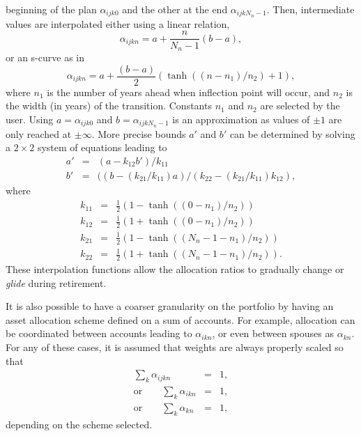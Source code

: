 \documentclass{article}[fleqn,12pt]
\begin{document}
\begin{description}[leftmargin=4em,style=multiline]
	beginning of the plan $\alpha_{ijk0}$ and the other at the end
	$\alpha_{ijkN_n-1}$. Then, intermediate values are interpolated either using
	a linear relation,
\begin{equation}
	\alpha_{ijkn} = a + \frac{n}{N_n - 1} (b - a),
\end{equation}
or an s-curve as in
\begin{equation}
	\alpha_{ijkn} = a + \frac{(b - a)}{2}
	(\tanh((n-n_1)/n_2) + 1),
\end{equation}
	where $n_1$ is the number of years ahead when inflection point will occur, and $n_2$ is the
	width (in years) of the transition. Constants $n_1$ and $n_2$ are selected by the user.
	Using $a = \alpha_{ijk0}$ and $b = \alpha_{ijkN_n-1}$ is an approximation as values of $\pm 1$
	are only reached at $\pm \infty$.
	More precise bounds $a'$ and $b'$ can be determined by solving a $2\times 2$ system
	of equations leading to
	\begin{eqnarray}
		a' &=& (a - k_{12}b')/k_{11} \nonumber \\
		b' &=& ((b - (k_{21}/k_{11})a)/(k_{22} - (k_{21}/k_{11})k_{12}),
	\end{eqnarray}
	where
	\begin{eqnarray}
		k_{11} &=& \frac{1}{2}(1 - \tanh((0-n_1)/n_2)) \nonumber \\
		k_{12} &=& \frac{1}{2}(1 + \tanh((0-n_1)/n_2)) \nonumber \\
		k_{21} &=& \frac{1}{2}(1 - \tanh((N_n-1-n_1)/n_2)) \nonumber \\
		k_{22} &=& \frac{1}{2}(1 + \tanh((N_n-1-n_1)/n_2)).
	\end{eqnarray}
	These interpolation functions allow the allocation ratios to gradually change
	or {\em glide} during retirement.

	It is also possible to have a coarser granularity on the portfolio by
	having an asset allocation scheme
	defined on a sum of accounts. For example, allocation can be coordinated between accounts
	leading to $\alpha_{ikn}$, or even between spouses as $\alpha_{kn}$.
	For any of these cases, it is assumed that weights are always properly scaled so that
	\begin{eqnarray}
		\sum_{k} \alpha_{ijkn} &=& 1, \nonumber\\
		\text{or} \qquad \sum_{k} \alpha_{ikn} &=& 1, \nonumber\\
		\text{or} \qquad \sum_{k} \alpha_{kn} &=& 1,
	\end{eqnarray}
	depending on the scheme selected.


\end{description}
\end{document}
